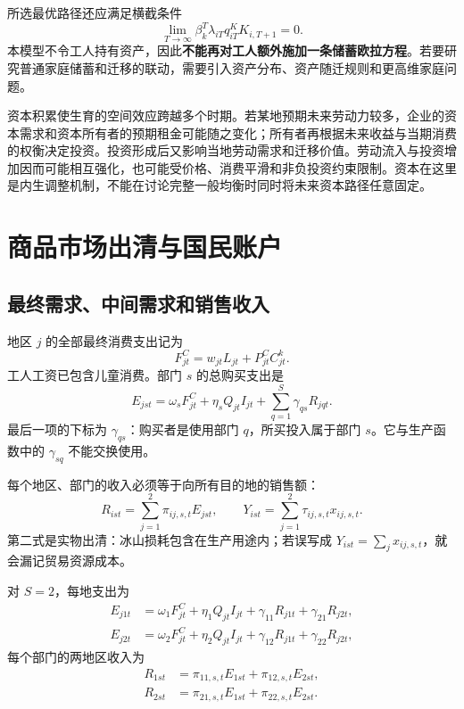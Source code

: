 \documentclass[UTF8,a4paper,zihao=-4,fontset=windows]{ctexart}
\numberwithin{equation}{section}
\newcommand{\pc}{P^{C}}
\newcommand{\invp}{Q}
\begin{document}
所选最优路径还应满足横截条件
\begin{equation}
 \lim_{T\to\infty}\beta_k^T\lambda_{iT}q^K_{iT}K_{i,T+1}=0.
 \label{eq:tvc}
\end{equation}
本模型不令工人持有资产，因此\textbf{不能再对工人额外施加一条储蓄欧拉方程}。若要研究普通家庭储蓄和迁移的联动，需要引入资产分布、资产随迁规则和更高维家庭问题。

资本积累使生育的空间效应跨越多个时期。若某地预期未来劳动力较多，企业的资本需求和资本所有者的预期租金可能随之变化；所有者再根据未来收益与当期消费的权衡决定投资。投资形成后又影响当地劳动需求和迁移价值。劳动流入与投资增加因而可能相互强化，也可能受价格、消费平滑和非负投资约束限制。资本在这里是内生调整机制，不能在讨论完整一般均衡时同时将未来资本路径任意固定。

\section{商品市场出清与国民账户}
\label{sec:clearing}

\subsection{最终需求、中间需求和销售收入}
地区 $j$ 的全部最终消费支出记为
\begin{equation}
 F^C_{jt}=w_{jt}L_{jt}+\pc_{jt}C^k_{jt}.
 \label{eq:consumption-expenditure}
\end{equation}
工人工资已包含儿童消费。部门 $s$ 的总购买支出是
\begin{equation}
 E_{jst}=\omega_sF^C_{jt}+\eta_s\invp_{jt}I_{jt}
 +\sum_{q=1}^S\gamma_{qs}R_{jqt}.
 \label{eq:sector-expenditure}
\end{equation}
最后一项的下标为 $\gamma_{qs}$：购买者是使用部门 $q$，所买投入属于部门 $s$。它与生产函数中的 $\gamma_{sq}$ 不能交换使用。

每个地区、部门的收入必须等于向所有目的地的销售额：
\begin{equation}
 R_{ist}=\sum_{j=1}^2\pi_{ij,s,t}E_{jst},
 \qquad
 Y_{ist}=\sum_{j=1}^2\tau_{ij,s,t}x_{ij,s,t}.
 \label{eq:goods-clearing}
\end{equation}
第二式是实物出清：冰山损耗包含在生产用途内；若误写成 $Y_{ist}=\sum_jx_{ij,s,t}$，就会漏记贸易资源成本。

对 $S=2$，每地支出为
\begin{align}
 E_{j1t}&=\omega_1F^C_{jt}+\eta_1\invp_{jt}I_{jt}
 +\gamma_{11}R_{j1t}+\gamma_{21}R_{j2t},\\
 E_{j2t}&=\omega_2F^C_{jt}+\eta_2\invp_{jt}I_{jt}
 +\gamma_{12}R_{j1t}+\gamma_{22}R_{j2t},
\end{align}
每个部门的两地区收入为
\begin{align}
 R_{1st}&=\pi_{11,s,t}E_{1st}+\pi_{12,s,t}E_{2st},\\
 R_{2st}&=\pi_{21,s,t}E_{1st}+\pi_{22,s,t}E_{2st}.
\end{align}
\end{document}
